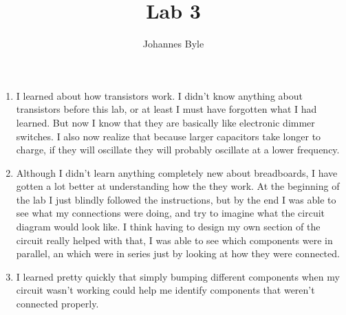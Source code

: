 \documentclass[12pt]{article}
\author{Johannes Byle}
\begin{document}
    \title{Lab 3}
    \maketitle
    \begin{enumerate}
        \item I learned about how transistors work.
        I didn't know anything about transistors before this lab, or at least I must have forgotten what I had learned.
        But now I know that they are basically like electronic dimmer switches.
        I also now realize that because larger capacitors take longer to charge, if they will oscillate they will
        probably oscillate at a lower frequency.
        \item Although I didn't learn anything completely new about breadboards, I have gotten a lot better at
        understanding how the they work.
        At the beginning of the lab I just blindly followed the instructions, but by the end I was able to see what
        my connections were doing, and try to imagine what the circuit diagram would look like.
        I think having to design my own section of the circuit really helped with that, I was able to see which
        components were in parallel, an which were in series just by looking at how they were connected.
        \item I learned pretty quickly that simply bumping different components when my circuit wasn't working could
        help me identify components that weren't connected properly.
    \end{enumerate}
\end{document}
